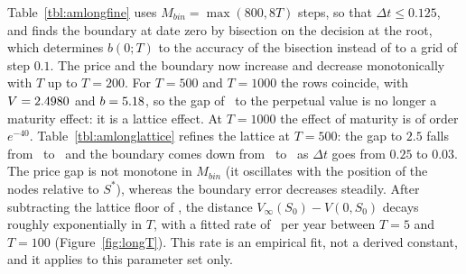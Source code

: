 Table~\ref{tbl:amlongfine} uses $M_{bin}=\max(800,8T)$ steps, so that $\Delta t\le0.125$, and finds the boundary at date zero by bisection on the decision at the root, which determines $b(0;T)$ to the accuracy of the bisection instead of to a grid of step $0.1$.
The price and the boundary now increase and decrease monotonically with $T$ up to $T=200$.
For $T=500$ and $T=1000$ the rows coincide, with $V=2.4980$ and $b=5.18$, so the gap of \LongGapThousand\ to the perpetual value is no longer a maturity effect: it is a lattice effect.
At $T=1000$ the effect of maturity is of order $e^{-40}$.
Table~\ref{tbl:amlonglattice} refines the lattice at $T=500$: the gap to $2.5$ falls from \LatVgapCoarse\ to \LatVgap\ and the boundary comes down from \LatBcoarse\ to \LatBfine\ as $\Delta t$ goes from $0.25$ to $0.03$.
The price gap is not monotone in $M_{bin}$ (it oscillates with the position of the nodes relative to $S^*$), whereas the boundary error decreases steadily.
After subtracting the lattice floor of \LongFloor, the distance $V_\infty(S_0)-V(0,S_0)$ decays roughly exponentially in $T$, with a fitted rate of \LongDecay\ per year between $T=5$ and $T=100$ (Figure~\ref{fig:longT}).
This rate is an empirical fit, not a derived constant, and it applies to this parameter set only.

